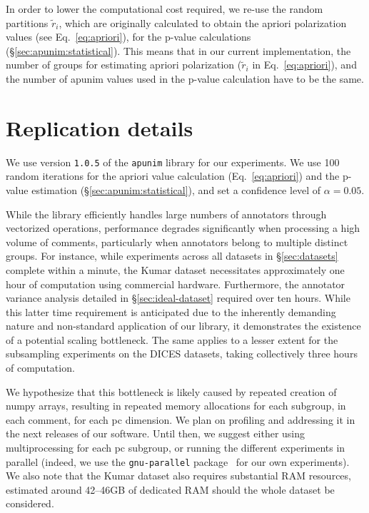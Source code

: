 \documentclass[11pt]{article}
\theoremstyle{definition}
\theoremstyle{plain}
\begin{document}
In order to lower the computational cost required, we re-use the random partitions $\tilde{r}_i$, which are originally calculated to obtain the apriori polarization values (see Eq.~\ref{eq:apriori}), for the p-value calculations (\S\ref{sec:apunim:statistical}). This means that in our current implementation, the number of groups for estimating apriori polarization ($\tilde{r}_i$ in Eq.~\ref{eq:apriori}), and the number of apunim values used in the p-value calculation have to be the same.


\section{Replication details}
\label{app:replication}

We use version \texttt{1.0.5} of the \texttt{apunim} library for our experiments. We use 100 random iterations for the apriori value calculation (Eq.~\ref{eq:apriori}) and the p-value estimation (\S\ref{sec:apunim:statistical}), and set a confidence level of $\alpha=0.05$.

While the library efficiently handles large numbers of annotators through vectorized operations, performance degrades significantly when processing a high volume of comments, particularly when annotators belong to multiple distinct groups. For instance, while experiments across all datasets in \S\ref{sec:datasets} complete within a minute, the Kumar dataset necessitates approximately one hour of computation using commercial hardware. Furthermore, the annotator variance analysis detailed in \S\ref{sec:ideal-dataset} required over ten hours. While this latter time requirement is anticipated due to the inherently demanding nature and non-standard application of our library, it demonstrates the existence of a potential scaling bottleneck. The same applies to a lesser extent for the subsampling experiments on the DICES datasets, taking collectively three hours of computation.

We hypothesize that this bottleneck is likely caused by repeated creation of numpy arrays, resulting in repeated memory allocations for each subgroup, in each comment, for each \ac{pc} dimension. We plan on profiling and addressing it in the next releases of our software. Until then, we suggest either using multiprocessing for each \ac{pc} subgroup, or running the different experiments in parallel (indeed, we use the \texttt{gnu-parallel} package~\cite{tange_2025_16944306} for our own experiments). We also note that the Kumar dataset also requires substantial RAM resources, estimated around 42--46GB of dedicated RAM should the whole dataset be considered.
\end{document}
